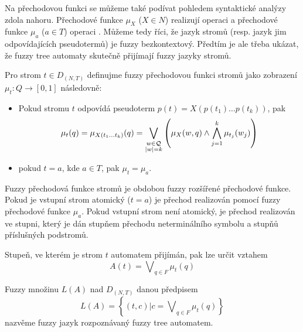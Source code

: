 \documentclass[a4paper,10pt]{article}
\begin{document}
Na přechodovou funkci se můžeme také podívat pohledem syntaktické analýzy zdola nahoru. Přechodové funkce $\mu_X$ ($X \in N$) realizují operaci  a přechodové funkce $\mu_a$ ($a \in T$) operaci . Můžeme tedy říci, že jazyk stromů (resp. jazyk jim odpovídajících pseudotermů) je fuzzy bezkontextový. Předtím je ale třeba ukázat, že fuzzy tree automaty skutečně přijímají fuzzy jazyky stromů.

\begin{definition}
 Pro strom $t \in D_{(N,T)}$ definujme fuzzy přechodovou funkci stromů jako zobrazení $\mu_t: Q \rightarrow [0,1]$ následovně:
 \begin{itemize}
  \item Pokud stromu $t$ odpovídá pseudoterm $p(t) = X(p(t_1) \dots p(t_k))$, pak 
  $$
    \mu_t(q) 
      = \mu_{X(t_1 \dots t_k)}(q) \\
      = \bigvee_{\substack{w \in \mathcal{Q} \\ |w| = k}} \left( \mu_X(w, q) \wedge \bigwedge_{j=1}^{k} \mu_{t_j}(w_j) \right)
  $$
  \item pokud $t = a$, kde $a \in T$, pak $\mu_t = \mu_a$. 
 \end{itemize}
\end{definition}

Fuzzy přechodová funkce stromů je obdobou fuzzy rozšířené přechodové funkce. Pokud je vstupní strom atomický ($t = a$) je přechod realizován pomocí fuzzy přechodové funkce $\mu_a$. Pokud vstupní strom není atomický, je přechod realizován ve stupni, který je dán stupňem přechodu neterminálního symbolu a stupňů příslušných podstromů.

Stupeň, ve kterém je strom $t$ automatem přijímán, pak lze určit vztahem
$$
 A(t) = \bigvee\nolimits_{q \in F} \mu_t(q)
$$

\begin{definition}
 Fuzzy množinu $L(A)$ nad $D_{(N,T)}$ danou předpisem
 $$
  L(A) = \left\{ (t, c) | c = \bigvee\nolimits_{q \in F} \mu_t(q) \right\}
 $$
 nazvěme fuzzy jazyk rozpoznávaný fuzzy tree automatem.
\end{definition}
\end{document}
